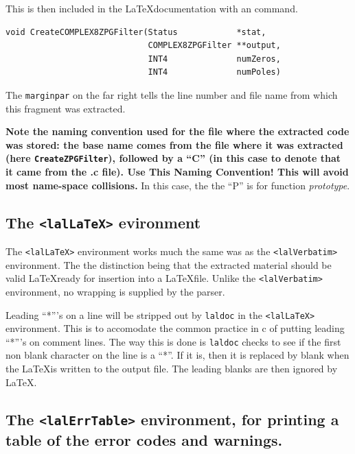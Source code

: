 \documentclass[oneside]{book}
\begin{document}
{{{{This is then included in the \LaTeX documentation with an
\verb@@ command.

\vspace{-1ex}
\mbox{}
\vspace{-3ex}
\begin{verbatim}
void CreateCOMPLEX8ZPGFilter(Status            *stat,
                             COMPLEX8ZPGFilter **output,
                             INT4              numZeros,
                             INT4              numPoles)
\end{verbatim}

The {\tt marginpar} on the far right tells the line number and file
name from which this fragment was extracted.

{\bf Note the naming convention used for the file where the extracted
code was stored: the base name comes from the file where it was
extracted (here {\texttt {CreateZPGFilter}}), followed by a ``C'' (in
this case to denote that it came from the .c file).  {\Large {Use This
Naming Convention!}} This will avoid most name-space collisions.}  In
this case,  the the ``P'' is for function {\it prototype}.


\subsection{The {\texttt {<lalLaTeX>} } evironment }

The {\texttt {<lalLaTeX>} } environment works much the same
was as the {\texttt {<lalVerbatim>} } environment. The the distinction
being that the extracted material should be valid \LaTeX ready
for insertion into a \LaTeX file. Unlike the 
{\texttt {<lalVerbatim>} } environment, no wrapping is supplied
by the parser.

Leading ``*'''s on a line will be stripped out by {\tt laldoc} in the
{\texttt {<lalLaTeX>}} environment. This is to accomodate the common
practice in c of putting leading ``*'''s on comment lines.  The way
this is done is {\tt laldoc} checks to see if the first non blank
character on the line is a ``*''. If it is, then it is replaced by
blank when the \LaTeX is written to the output file. The leading
blanks are then ignored by \LaTeX.


\subsection{The {\texttt {<lalErrTable>} } environment, for printing
a table of the error codes and warnings.}

}}}}
\end{document}
